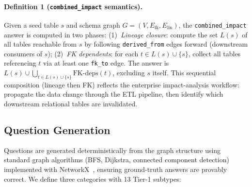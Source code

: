 \paragraph{Definition 1 (\texttt{combined\_impact} semantics).}
\label{def:combined_impact}
Given a seed table $s$ and schema graph $G = (V, E_{\text{fk}}, E_{\text{lin}})$,
the \texttt{combined\_impact} answer is computed in two phases:
(1)~\emph{Lineage closure}: compute the set $L(s)$ of all tables reachable
from $s$ by following \texttt{derived\_from} edges forward (downstream
consumers of $s$);
(2)~\emph{FK dependents}: for each $t \in L(s) \cup \{s\}$, collect all tables
referencing $t$ via at least one \texttt{fk\_to} edge.
The answer is $L(s) \cup \bigcup_{t \in L(s) \cup \{s\}} \text{FK-deps}(t)$,
excluding $s$ itself.
This sequential composition (lineage then FK) reflects the enterprise
impact-analysis workflow: propagate the data change through the ETL pipeline,
then identify which downstream relational tables are invalidated.

\subsection{Question Generation}
\label{sec:qa-generation}

Questions are generated deterministically from the graph structure using
standard graph algorithms (BFS, Dijkstra, connected component detection)
implemented with NetworkX~\cite{networkx2008}, ensuring ground-truth
answers are provably correct.  We define three categories with 13 Tier-1
subtypes:

